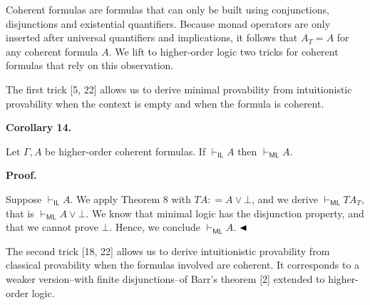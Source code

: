Coherent formulas are formulas that can only be built using conjunctions, disjunctions and existential quantifiers. Because monad operators are only inserted after universal quantifiers and implications, it follows that $A_{T}=A$ for any coherent formula $A$. We lift to higher-order logic two tricks for coherent formulas that rely on this observation.\par
 
 
 
The first trick [5, 22] allows us to derive minimal provability from intuitionistic provability when the context is empty and when the formula is coherent.\par
 
 
 
\par\medskip\noindent\textbf{Corollary 14.}\par
 
 
Let $\Gamma,A$ be higher-order coherent formulas. If $\vdash_{\mathsf{IL}}A$ then $\vdash_{\mathsf{ML}}A$.\par
 
 
 
 
\par\medskip\noindent\textbf{Proof.}\par
 
 
Suppose $\vdash_{\mathsf{IL}}A$. We apply Theorem 8 with $TA\mathrel{\mathop{:}}=A\mathbin{\vee}\bot$, and we derive $\vdash_{\mathsf{ML}}TA_{T}$, that is $\vdash_{\mathsf{ML}}A\mathbin{\vee}\bot$. We know that minimal logic has the disjunction property, and that we cannot prove $\bot$. Hence, we conclude $\vdash_{\mathsf{ML}}A$. $\hfill\blacktriangleleft$\par
 
 
 
The second trick [18, 22] allows us to derive intuitionistic provability from classical provability when the formulas involved are coherent. It corresponds to a weaker version–with finite disjunctions–of Barr’s theorem [2] extended to higher-order logic.\par
 
